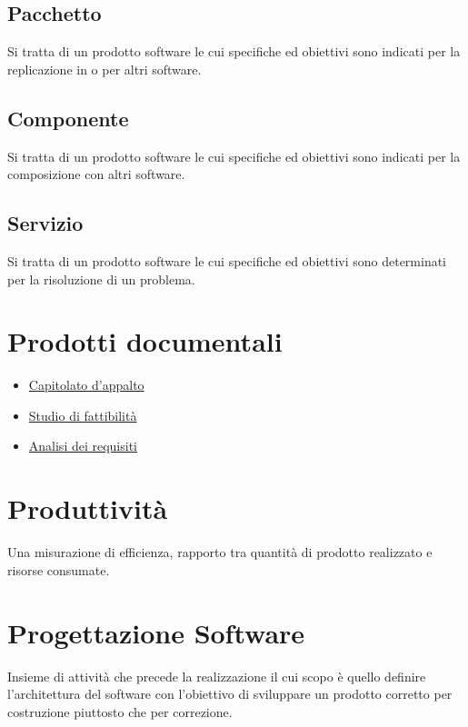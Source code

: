 \documentclass[11pt]{article}
\begin{document}
		\subsection{Pacchetto}
		Si tratta di un prodotto software le cui specifiche ed obiettivi sono indicati per la replicazione in o per altri software.
		
		\subsection{Componente}
		Si tratta di un prodotto software le cui specifiche ed obiettivi sono indicati per la composizione con altri software.
		
		\subsection{Servizio}
		Si tratta di un prodotto software le cui specifiche ed obiettivi sono determinati per la risoluzione di un problema.
	
	\section{\LARGE Prodotti documentali}	
	\label{sec:prodottidocumentali}
	\begin{itemize}  
	\item \hyperref[sec:capitolato]{Capitolato d'appalto}
	\item \hyperref[sec:studiofattibilita]{Studio di fattibilità}
	\item \hyperref[sec:analisirequisiti]{Analisi dei requisiti} 
	\end{itemize}	
		
	\section{\LARGE Produttività}	
	\label{sec:produttivita}
	Una misurazione di efficienza, rapporto tra quantità di prodotto realizzato e risorse consumate.

	\section{\LARGE Progettazione Software}
	\label{sec:progettazionesoftware}
	Insieme di attività che precede la realizzazione il cui scopo è quello definire l'architettura del software con l'obiettivo di sviluppare un prodotto corretto per costruzione piuttosto che per correzione.
	
\end{document}
